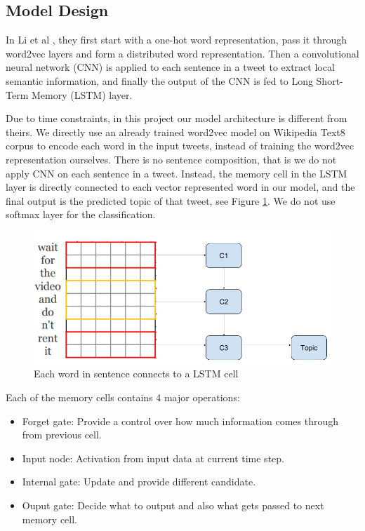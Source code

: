\documentclass[journal, a4paper]{IEEEtran}
\begin{document}
\subsection{Model Design}
In Li et al \cite{Li-lstm}, they first start with a one-hot word representation, pass it through word2vec layers and form a distributed word representation. Then a convolutional neural network (CNN) is applied to each sentence in a tweet to extract local semantic information, and finally the output of the CNN is fed to Long Short-Term Memory (LSTM) layer. 

Due to time constraints, in this project our model architecture is different from theirs. We directly use an already trained word2vec model on Wikipedia Text8 corpus to encode each word in the input tweets, instead of training the word2vec representation ourselves. There is no sentence composition, that is we do not apply CNN on each sentence in a tweet. Instead, the memory cell in the LSTM layer is directly connected to each vector represented word in our model, and the final output is the predicted topic of that tweet, see Figure \ref{fig:4}. We do not use softmax layer for the classification.
\begin{figure}[!hbt]
	\centering
	\includegraphics[width=\columnwidth]{cell.png}
	\caption{Each word in sentence connects to a LSTM cell}
	\label{fig:4}
\end{figure}

Each of the memory cells contains 4 major operations: 
\begin{itemize}
\item Forget gate: Provide a control over how much information comes through from previous cell.
\item Input node: Activation from input data at current time step.
\item Internal gate: Update and provide different candidate.
\item Ouput gate: Decide what to output and also what gets passed to next memory cell.
\end{itemize} 
\end{document}
